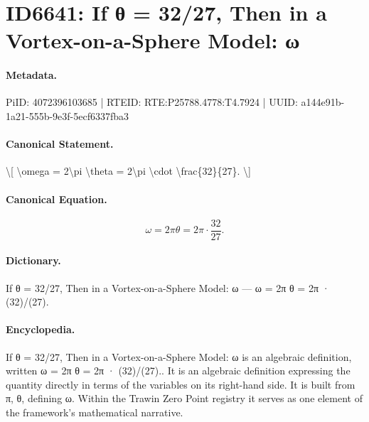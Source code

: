 \section*{ID6641: If θ = 32/27, Then in a Vortex-on-a-Sphere Model: ω}
\paragraph{Metadata.}
PiID: 4072396103685 | RTEID: RTE:P25788.4778:T4.7924 | UUID: a144e91b-1a21-555b-9e3f-5ecf6337fba3

\paragraph{Canonical Statement.}
\textbackslash{}[ \textbackslash{}omega = 2\textbackslash{}pi \textbackslash{}theta = 2\textbackslash{}pi \textbackslash{}cdot \textbackslash{}frac\{32\}\{27\}. \textbackslash{}]

\paragraph{Canonical Equation.}
\[
\omega = 2\pi \theta = 2\pi \cdot \frac{32}{27}.
\]

\paragraph{Dictionary.}
If θ = 32/27, Then in a Vortex-on-a-Sphere Model: ω — ω = 2π θ = 2π · (32)/(27).

\paragraph{Encyclopedia.}
If θ = 32/27, Then in a Vortex-on-a-Sphere Model: ω is an algebraic definition, written ω = 2π θ = 2π · (32)/(27).. It is an algebraic definition expressing the quantity directly in terms of the variables on its right-hand side. It is built from π, θ, defining ω. Within the Trawin Zero Point registry it serves as one element of the framework's mathematical narrative.
